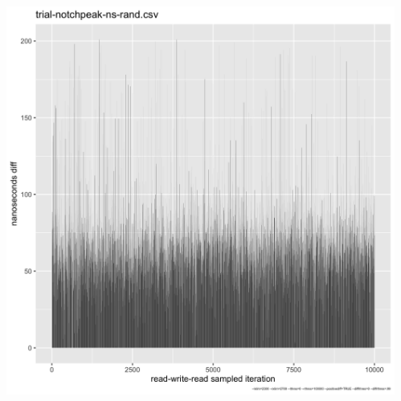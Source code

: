 \documentclass{beamer}
\begin{document}
\begin{frame}
\begin{columns}
\begin{column}{0.5\textwidth}
  \end{column}
  \begin{column}{0.5\textwidth}
   \includegraphics[width=\linewidth]{trial-notchpeak-ns-rand-barchart.png}

  \end{column}

 \end{columns}

\end{frame}
\end{document}
